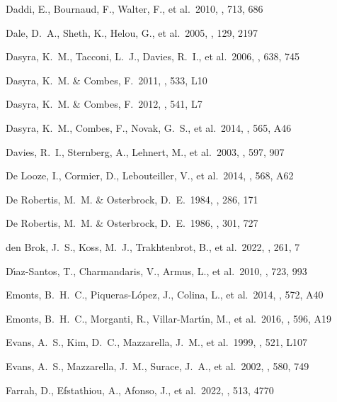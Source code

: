 \documentclass{aa}
\begin{document}
\begin{thebibliography}
 Daddi, E., Bournaud, F., Walter, F., et al.\ 2010, \apj, 713, 686


 Dale, D.~A., Sheth, K., Helou, G., et al.\ 2005, \aj, 129, 2197

 Dasyra, K.~M., Tacconi, L.~J., Davies, R.~I., et al.\ 2006, \apj, 638, 745

 Dasyra, K.~M. \& Combes, F.\ 2011, \aap, 533, L10

 Dasyra, K.~M. \& Combes, F.\ 2012, \aap, 541, L7

 Dasyra, K.~M., Combes, F., Novak, G.~S., et al.\ 2014, \aap, 565, A46

 Davies, R.~I., Sternberg, A., Lehnert, M., et al.\ 2003, \apj, 597, 907



 De Looze, I., Cormier, D., Lebouteiller, V., et al.\ 2014, \aap, 568, A62



 De Robertis, M.~M. \& Osterbrock, D.~E.\ 1984, \apj, 286, 171

 De Robertis, M.~M. \& Osterbrock, D.~E.\ 1986, \apj, 301, 727

 den Brok, J.~S., Koss, M.~J., Trakhtenbrot, B., et al.\ 2022, \apjs, 261, 7


 D{\'\i}az-Santos, T., Charmandaris, V., Armus, L., et al.\ 2010, \apj, 723, 993

 Emonts, B.~H.~C., Piqueras-L{\'o}pez, J., Colina, L., et al.\ 2014, \aap, 572, A40

 Emonts, B.~H.~C., Morganti, R., Villar-Mart{\'\i}n, M., et al.\ 2016, \aap, 596, A19

 Evans, A.~S., Kim, D.~C., Mazzarella, J.~M., et al.\ 1999, \apjl, 521, L107

 Evans, A.~S., Mazzarella, J.~M., Surace, J.~A., et al.\ 2002, \apj, 580, 749

 Farrah, D., Efstathiou, A., Afonso, J., et al.\ 2022, \mnras, 513, 4770


\end{thebibliography}
\end{document}
